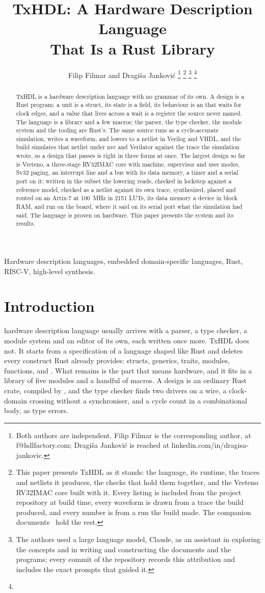 \documentclass[journal,9pt]{IEEEtran}
\title{TxHDL: A Hardware Description Language\\That Is a Rust Library}
\author{Filip Filmar and Dragiša Janković%
\thanks{Both authors are independent. Filip Filmar is the
corresponding author, at f@hdlfactory.com; Dragiša Janković is
reached at linkedin.com/in/dragisa-jankovic.}%
\thanks{This paper presents TxHDL as it stands: the language, its
runtime, the traces and netlists it produces, the checks that hold
them together, and the Vreteno RV32IMAC core built with it. Every
listing is included from the project repository \code{HDL/txhdl} at
build time, every waveform is drawn from a trace the build produced,
and every number is from a run the build made. The companion
documents~\cite{cover} hold the rest.}%
\thanks{The authors used a large language model, Claude, as an
assistant in exploring the concepts and in writing and constructing
the documents and the programs; every commit of the repository records
this attribution and includes the exact prompts that guided it.}%
\thanks{\buildstamp}}
\begin{document}
\maketitle

\begin{abstract}
TxHDL is a hardware description language with no grammar of its own.
A design is a Rust program: a unit is a struct, its state is a field,
its behaviour is an  that waits for clock edges, and a
value that lives across a wait is a register the source never named.
The language is a library and a few macros; the parser, the type
checker, the module system and the tooling are Rust's. The same
source runs as a cycle-accurate simulation, writes a waveform, and
lowers to a netlist in Verilog and VHDL, and the build simulates that
netlist under nvc and Verilator against the trace the simulation
wrote, so a design that passes is right in three forms at once. The
largest design so far is Vreteno, a three-stage RV32IMAC core with
machine, supervisor and user modes, Sv32 paging, an interrupt line and
a bus with its data
memory, a timer and a serial port on it: written in the subset the
lowering reads, checked
in lockstep against a reference model, checked as a netlist against
its own trace, synthesized, placed and routed on an Artix-7 at
100~MHz in 2151 LUTs, its data memory a device in block RAM, and run
on the board, where it said on its serial port what the simulation
had said. The language is proven on hardware. This paper presents
the system and its results.
\end{abstract}

\begin{IEEEkeywords}
Hardware description languages, embedded domain-specific languages,
Rust, RISC-V, high-level synthesis.
\end{IEEEkeywords}

\section{Introduction}
\label{sec:p-intro}

 hardware description language usually arrives with
a parser, a type checker, a module system and an editor of its own,
each written once more. TxHDL does not. It starts from a
specification of a language shaped like Rust and deletes every
construct Rust already provides: structs, generics, traits, modules,
functions,  and . What remains is the part
that means hardware, and it fits in a library of five modules and a
handful of macros. A design is an ordinary Rust crate, compiled by
, and the type checker finds two drivers on a wire, a
clock-domain crossing without a synchroniser, and a cycle count in a
combinational body, as type errors.
\end{document}
